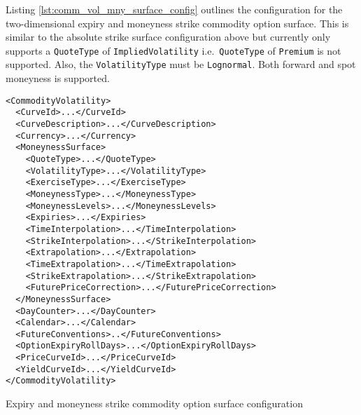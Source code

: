 Listing \ref{lst:comm_vol_mny_surface_config} outlines the configuration for the two-dimensional expiry and moneyness strike commodity option surface. This is similar to the absolute strike surface configuration above but currently only supports a \lstinline!QuoteType! of \lstinline!ImpliedVolatility! i.e.\ \lstinline!QuoteType! of \lstinline!Premium! is not supported. Also, the \lstinline!VolatilityType! must be \lstinline!Lognormal!. Both forward and spot moneyness is supported.

\begin{longlisting}
\begin{verbatim}
<CommodityVolatility>
  <CurveId>...</CurveId>
  <CurveDescription>...</CurveDescription>
  <Currency>...</Currency>
  <MoneynessSurface>
    <QuoteType>...</QuoteType>
    <VolatilityType>...</VolatilityType>
    <ExerciseType>...</ExerciseType>
    <MoneynessType>...</MoneynessType>
    <MoneynessLevels>...</MoneynessLevels>
    <Expiries>...</Expiries>
    <TimeInterpolation>...</TimeInterpolation>
    <StrikeInterpolation>...</StrikeInterpolation>
    <Extrapolation>...</Extrapolation>
    <TimeExtrapolation>...</TimeExtrapolation>
    <StrikeExtrapolation>...</StrikeExtrapolation>
    <FuturePriceCorrection>...</FuturePriceCorrection>
  </MoneynessSurface>
  <DayCounter>...</DayCounter>
  <Calendar>...</Calendar>
  <FutureConventions>..</FutureConventions>
  <OptionExpiryRollDays>...</OptionExpiryRollDays>
  <PriceCurveId>...</PriceCurveId>
  <YieldCurveId>...</YieldCurveId>
</CommodityVolatility>
\end{verbatim}
\caption{Expiry and moneyness strike commodity option surface configuration}
\label{lst:comm_vol_mny_surface_config}
\end{longlisting}


